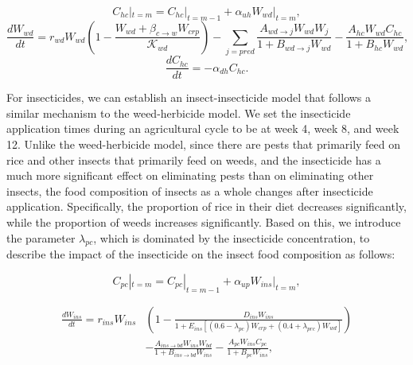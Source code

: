 \documentclass{HZNUMCM}
\begin{document}
        \begin{equation}
        C_{hc}|_{t=m} = C_{hc}|_{t=m-1} + \alpha_{uh} W_{wd}|_{t=m},
        \end{equation}
        \begin{equation}
        \frac{dW_{wd}}{dt} = r_{wd}W_{wd} \left( 1 - \frac{W_{wd} + \beta_{c \rightarrow w} W_{crp}}{\mathscr{K}_{wd}} \right) - \sum_{j=pred}{\frac{A_{wd\rightarrow j} W_{wd} W_{j}}{1 + B_{wd\rightarrow j} W_{wd}}} - \frac{A_{hc} W_{wd} C_{hc}}{1 + B_{hc} W_{wd}},
        \end{equation}
        \begin{equation}
        \frac{dC_{hc}}{dt} = - \alpha_{dh} C_{hc}.
        \end{equation}
        
        For insecticides, we can establish an insect-insecticide model that follows a similar mechanism to the weed-herbicide model. 
        We set the insecticide application times during an agricultural cycle to be at week 4, week 8, and week 12. Unlike the weed-herbicide model, 
        since there are pests that primarily feed on rice and other insects that primarily feed on weeds, 
        and the insecticide has a much more significant effect on eliminating pests than on eliminating other insects, 
        the food composition of insects as a whole changes after insecticide application. Specifically, 
        the proportion of rice in their diet decreases significantly, while the proportion of weeds increases significantly. 
        Based on this, we introduce the parameter \( \lambda_{pc} \), which is dominated by the insecticide concentration, 
        to describe the impact of the insecticide on the insect food composition as follows:
        
        \begin{equation}
          C_{pc}|_{t=m} = C_{pc}|_{t=m-1} + \alpha_{up} W_{ins}|_{t=m}, 
        \end{equation}

        \begin{equation}
          \begin{split}
            \frac{dW_{ins}}{dt} = r_{ins} W_{ins} &\left( 1 - \frac{D_{ins} W_{ins}}{1 + E_{ins} \left[ (0.6 - \lambda_{pc}) W_{crp} + (0.4 + \lambda_{prc}) W_{wd} \right]} \right) \\
            &-\frac{A_{ins\rightarrow bd} W_{ins} W_{bd}}{1 + B_{ins\rightarrow bd} W_{ins}} - \frac{A_{pc} W_{ins} C_{pc}}{1 + B_{pc} W_{ins}},
          \end{split}
      \end{equation}
\end{document}
